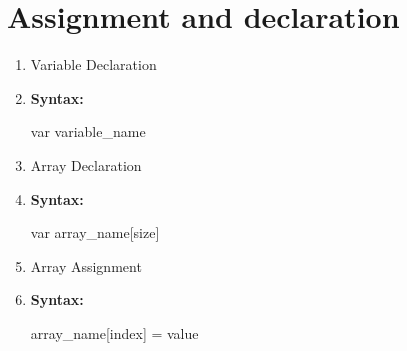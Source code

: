 \documentclass{scrreprt}
\begin{document}
\section{Assignment and declaration}
\begin{enumerate}
\item Variable Declaration
\item[] \textbf{Syntax:}\\
\begin{center}
var variable_name
\end{center}

\item Array Declaration
\item[] \textbf{Syntax:}\\
\begin{center}
var array_name[size]
\end{center} 

\item Array Assignment
\item[] \textbf{Syntax:}\\
\begin{center}
array_name[index] = value
\end{center}
\end{enumerate}
\end{document}

